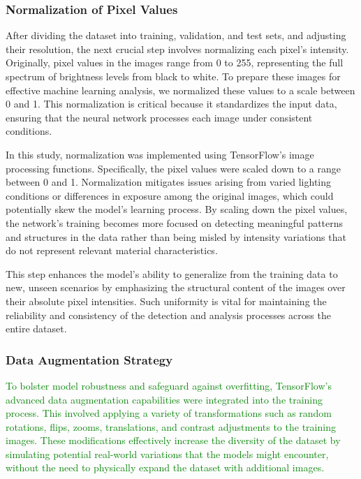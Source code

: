 \documentclass[preprint,12pt]{elsarticle}
\begin{document}
\subsubsection{Normalization of Pixel Values}
After dividing the dataset into training, validation, and test sets, and adjusting their resolution, the next crucial step involves normalizing each pixel's intensity. Originally, pixel values in the images range from 0 to 255, representing the full spectrum of brightness levels from black to white. To prepare these images for effective machine learning analysis, we normalized these values to a scale between 0 and 1. This normalization is critical because it standardizes the input data, ensuring that the neural network processes each image under consistent conditions.

In this study, normalization was implemented using TensorFlow’s image processing functions. Specifically, the pixel values were scaled down to a range between 0 and 1. Normalization mitigates issues arising from varied lighting conditions or differences in exposure among the original images, which could potentially skew the model's learning process. By scaling down the pixel values, the network's training becomes more focused on detecting meaningful patterns and structures in the data rather than being misled by intensity variations that do not represent relevant material characteristics.

This step enhances the model's ability to generalize from the training data to new, unseen scenarios by emphasizing the structural content of the images over their absolute pixel intensities. Such uniformity is vital for maintaining the reliability and consistency of the detection and analysis processes across the entire dataset.

\subsubsection{Data Augmentation Strategy}
\textcolor{green}{To bolster model robustness and safeguard against overfitting, TensorFlow’s advanced data augmentation capabilities were integrated into the training process. This involved applying a variety of transformations such as random rotations, flips, zooms, translations, and contrast adjustments to the training images. These modifications effectively increase the diversity of the dataset by simulating potential real-world variations that the models might encounter, without the need to physically expand the dataset with additional images.}
\end{document}
